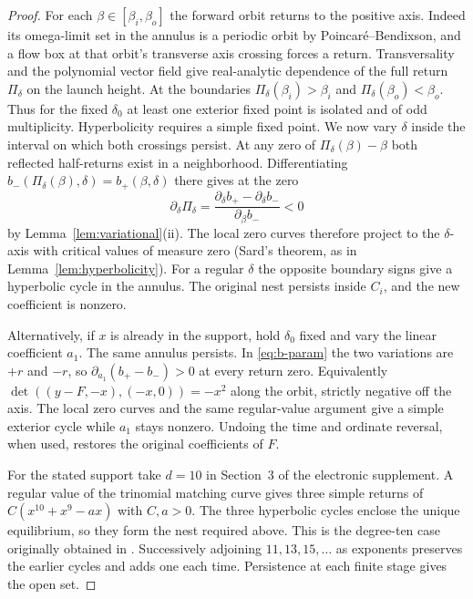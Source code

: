 \begin{proof}
For each $\beta\in[\beta_i,\beta_o]$ the forward orbit returns to the
positive axis. Indeed its omega-limit set in the annulus is a periodic
orbit by Poincar\'e--Bendixson, and a flow box at that orbit's transverse
axis crossing forces a return. Transversality and the polynomial vector
field give real-analytic dependence of the full return $\Pi_\delta$ on
the launch height. At the boundaries $\Pi_\delta(\beta_i)>\beta_i$ and
$\Pi_\delta(\beta_o)<\beta_o$. Thus for the fixed $\delta_0$ at least
one exterior fixed point is isolated and of odd multiplicity.
Hyperbolicity requires a simple fixed point. We now vary $\delta$
inside the interval on which both crossings persist.
At any zero of $\Pi_\delta(\beta)-\beta$ both reflected half-returns exist
in a neighborhood. Differentiating
$b_-(\Pi_\delta(\beta),\delta)=b_+(\beta,\delta)$ there gives at the zero
\[
 \partial_\delta\Pi_\delta=
 \frac{\partial_\delta b_+-\partial_\delta b_-}{\partial_\beta b_-}<0
\]
by Lemma~\ref{lem:variational}(ii). The local zero curves therefore
project to the $\delta$-axis with critical values of measure zero
(Sard's theorem, as in Lemma~\ref{lem:hyperbolicity}). For a regular
$\delta$ the opposite boundary signs give a hyperbolic cycle in the
annulus. The original nest persists inside $C_i$, and the new coefficient
is nonzero.

Alternatively, if $x$ is already in the support, hold $\delta_0$ fixed
and vary the linear coefficient $a_1$. The same annulus persists.
In \eqref{eq:b-param} the two variations are $+r$ and $-r$,
so $\partial_{a_1}(b_+-b_-)>0$ at every return zero. Equivalently
$\det((y-F,-x),(-x,0))=-x^2$ along the orbit, strictly negative
off the axis. The local zero curves and the same regular-value argument
give a simple exterior cycle while $a_1$ stays nonzero. Undoing the time and ordinate reversal, when used, restores
the original coefficients of $F$.

For the stated support take $d=10$ in Section~3 of the electronic
supplement. A regular value of the trinomial matching curve gives
three simple returns of $C(x^{10}+x^9-ax)$ with $C,a>0$. The three
hyperbolic cycles enclose the unique equilibrium, so they form the
nest required above. This is the degree-ten case originally obtained
in \cite[proof of Theorem~1.2]{CJLZ}. Successively adjoining
$11,13,15,\ldots$ as exponents preserves the earlier cycles and adds
one each time. Persistence at each finite stage gives the open set.
\end{proof}
